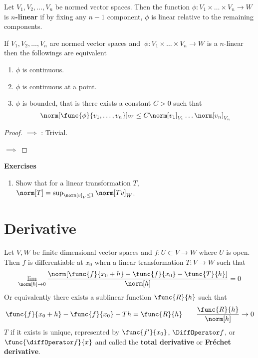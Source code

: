 \begin{definition}
    Let \(V_1, V_2 ,\dots , V_n\) be  normed vector spaces. Then the function \(\phi : V_1 \times \dots \times V_n \to W\) is \textbf{\(n\)-linear} if by fixing any \(n-1\) component, \(\phi\) is linear relative to the remaining components.
\end{definition}

\begin{proposition}
    If \(V_1, V_2, \dots , V_n\) are  normed vector spaces and \(\ \phi : V_1 \times \dots \times V_n \to W \) is a \(n\)-linear then the followings are equivalent
    \begin{enumerate}
        \item \(\phi\) is continuous. \label{it:continuityOfnLinear}
        \item \(\phi\) is continuous at a point. \label{it:continuityOfnLinearataPoint}
        \item \(\phi\) is bounded, that is there exists a constant \(C > 0\) such that \label{it:boundednessOfnLinear}
              \begin{equation*}
                  \norm[\func{\phi}{v_1, \dots ,v_n}]_W \leq C \norm[v_1]_{V_1} \dots \norm[v_n]_{V_n}
              \end{equation*}
    \end{enumerate}
\end{proposition}


\begin{proof}
     \(\implies\) : Trivial.

     \(\implies\) 
\end{proof}

{\Large\textbf{Exercises}}
\begin{enumerate}
    \item Show that for a linear transformation \(T\), \(\norm[T] = \sup_{\norm[v]_V \leq 1} \norm[Tv]_W\).
\end{enumerate}
\newpage

\section{Derivative}
Let \(V,W\) be finite dimensional vector spaces and \(f: U \subset V \to W\) where \(U\) is open. Then \(f\) is differentiable at \(x_0\) when a linear transformation \(T : V \to W\) such that
\begin{equation*}
    \lim_{\norm[h] \to 0} \dfrac{\norm[\func{f}{x_0 + h} - \func{f}{x_0} - \func{T}{h}]}{\norm[h]}= 0
\end{equation*}
Or equivalently there exists a sublinear function \(\func{R}{h}\) such that
\begin{equation*}
    \func{f}{x_0 + h} - \func{f}{x_0} - Th = \func{R}{h} \qquad \frac{\func{R}{h}}{\norm[h]} \to 0
\end{equation*}
\(T\) if it exists is unique, represented by \(\func{f'}{x_0}\), \(\DiffOperator f\), or \(\func{\diffOperator f}{x}\) and called the \textbf{total derivative} or \textbf{Fr\'{e}chet derivative}.

